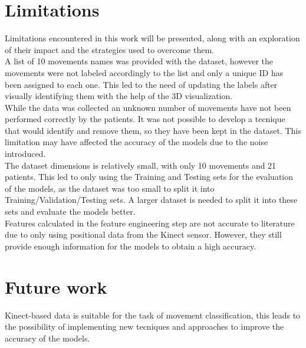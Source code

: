     \section{Limitations}

        Limitations encountered in this work will be presented, along with an exploration of their impact and the strategies used to overcome them. \\

        A list of 10 movements names was provided with the dataset, however the movements were not labeled accordingly to the list and only a unique ID has been assigned to each one. This led to the need of updating the labels after visually identifying them with the help of the 3D visualization. \\
        While the data was collected an unknown number of movements have not been performed correctly by the patients. It was not possible to develop a tecnique that would identify and remove them, so they have been kept in the dataset. This limitation may have affected the accuracy of the models due to the noise introduced.\\

        The dataset dimensions is relatively small, with only 10 movements and 21 patients. This led to only using the Training and Testing sets for the evaluation of the models, as the dataset was too small to split it into Training/Validation/Testing sets. A larger dataset is needed to split it into these sets and evaluate the models better. \\
        Features calculated in the feature engineering step are not accurate to literature due to only using positional data from the Kinect sensor. However, they still provide enough information for the models to obtain a high accuracy.

    \section{Future work}      

        Kinect-based data is suitable for the task of movement classification, this leads to the possibility of implementing new tecniques and approaches to improve the accuracy of the models. \\

